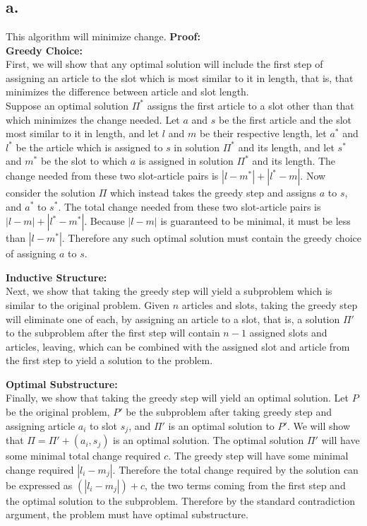 \documentclass[11pt]{article}
\begin{document}
\NewCommandCopy{\getss}{\gets}
\renewcommand{\gets}{$\getss$}

\section{}
\subsection*{a.}
This algorithm will minimize change. 
\textbf{Proof: } \\ 

\textbf{Greedy Choice: }\\ 
First, we will show that any optimal solution will include the first step of assigning an article to the slot which is most similar to it in length, that is, that minimizes the difference between article and slot length. \\ 
Suppose an optimal solution $\Pi^*$ assigns the first article to a slot other than that which minimizes the change needed. Let $a$ and $s$ be the first article and the slot most similar to it in length, and let $l$ and $m$ be their respective length, let $a^*$ and $l^*$ be the article which is assigned to $s$ in solution $\Pi^*$ and its length, and let $s^*$ and $m^*$ be the slot to which $a$ is assigned in solution $\Pi^*$ and its length. The change needed from these two slot-article pairs is $|l-m^*| + |l^*-m|$. Now consider the solution $\Pi$ which instead takes the greedy step and assigns $a$ to $s$, and $a^*$ to $s^*$. The total change needed from these two slot-article pairs is $|l - m| + |l^*-m^*|$. Because $|l - m|$ is guaranteed to be minimal, it must be less than $|l - m^*|$. Therefore any such optimal solution must contain the greedy choice of assigning $a$ to $s$.  

\textbf{Inductive Structure: }\\ 
Next, we show that taking the greedy step will yield a subproblem which is similar to the original problem. Given $n$ articles and slots, taking the greedy step will eliminate one of each, by assigning an article to a slot, that is, a solution $\Pi'$ to the subproblem after the first step will contain $n-1$ assigned slots and articles, leaving, which can be combined with the assigned slot and article from the first step to yield a solution to the problem.  

\textbf{Optimal Substructure: }\\ 
Finally, we show that taking the greedy step will yield an optimal solution. Let $P$ be the original problem, $P'$ be the subproblem after taking greedy step and assigning article $a_i$ to slot $s_j$, and $\Pi'$ is an optimal solution to $P'$. We will show that $\Pi = \Pi' + {(a_i, s_j)}$ is an optimal solution. The optimal solution $\Pi'$ will have some minimal total change required $c$. The greedy step will have some minimal change required $|l_i - m_j|$. Therefore the total change required by the solution can be expressed as $(|l_i - m_j|) + c$, the two terms coming from the first step and the optimal solution to the subproblem. Therefore by the standard contradiction argument, the problem must have optimal substructure.
\end{document}
